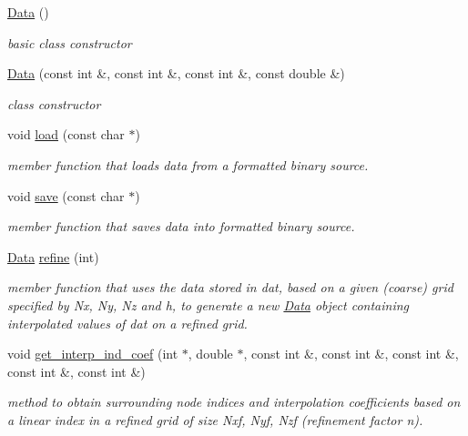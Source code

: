\begin{DoxyCompactItemize}
\item 
\hypertarget{class_data_af11f741cb7f587e2e495452a8905a22a}{}\hyperlink{class_data_af11f741cb7f587e2e495452a8905a22a}{Data} ()\label{class_data_af11f741cb7f587e2e495452a8905a22a}

\begin{DoxyCompactList}\small\item\em basic class constructor \end{DoxyCompactList}\item 
\hyperlink{class_data_a7fcbb819bb4248bf7b2879ecbd779856}{Data} (const int \&, const int \&, const int \&, const double \&)
\begin{DoxyCompactList}\small\item\em class constructor \end{DoxyCompactList}\item 
void \hyperlink{class_data_a1b87bf3e150457ed4802519e01269e6f}{load} (const char $\ast$)
\begin{DoxyCompactList}\small\item\em member function that loads data from a formatted binary source. \end{DoxyCompactList}\item 
void \hyperlink{class_data_af662d35ce891f3134126d7228c09ecf2}{save} (const char $\ast$)
\begin{DoxyCompactList}\small\item\em member function that saves data into formatted binary source. \end{DoxyCompactList}\item 
\hyperlink{class_data}{Data} \hyperlink{class_data_a918f999b5a6566dea80f2b2386d2e782}{refine} (int)
\begin{DoxyCompactList}\small\item\em member function that uses the data stored in dat, based on a given (coarse) grid specified by Nx, Ny, Nz and h, to generate a new \hyperlink{class_data}{Data} object containing interpolated values of dat on a refined grid. \end{DoxyCompactList}\item 
void \hyperlink{class_data_a50dd75925951c02569fc7d7e581246a2}{get\+\_\+interp\+\_\+ind\+\_\+coef} (int $\ast$, double $\ast$, const int \&, const int \&, const int \&, const int \&, const int \&)
\begin{DoxyCompactList}\small\item\em method to obtain surrounding node indices and interpolation coefficients based on a linear index in a refined grid of size Nxf, Nyf, Nzf (refinement factor n). \end{DoxyCompactList}\end{DoxyCompactItemize}
